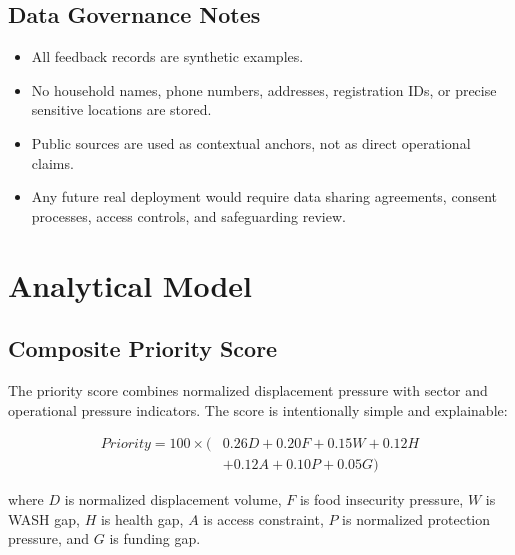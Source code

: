 \documentclass[11pt,a4paper]{article}
\begin{document}
\subsection{Data Governance Notes}

\begin{itemize}
  \item All feedback records are synthetic examples.
  \item No household names, phone numbers, addresses, registration IDs, or precise sensitive locations are stored.
  \item Public sources are used as contextual anchors, not as direct operational claims.
  \item Any future real deployment would require data sharing agreements, consent processes, access controls, and safeguarding review.
\end{itemize}

\section{Analytical Model}

\subsection{Composite Priority Score}

The priority score combines normalized displacement pressure with sector and operational pressure indicators. The score is intentionally simple and explainable:

\begin{equation}
\begin{aligned}
Priority = 100 \times (&0.26D + 0.20F + 0.15W + 0.12H \\
&+ 0.12A + 0.10P + 0.05G)
\end{aligned}
\end{equation}

where \(D\) is normalized displacement volume, \(F\) is food insecurity pressure, \(W\) is WASH gap, \(H\) is health gap, \(A\) is access constraint, \(P\) is normalized protection pressure, and \(G\) is funding gap.
\end{document}
